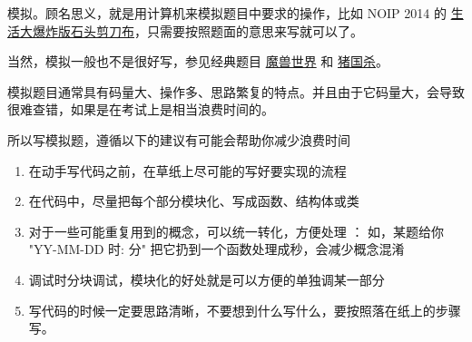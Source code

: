 
模拟。顾名思义，就是用计算机来模拟题目中要求的操作，比如 NOIP 2014 的 \href{https://loj.ac/problem/2498}{生活大爆炸版石头剪刀布}，只需要按照题面的意思来写就可以了。

当然，模拟一般也不是很好写，参见经典题目 \href{http://bailian.openjudge.cn/practice/3750/}{魔兽世界} 和 \href{https://www.lydsy.com/JudgeOnline/problem.php?id=1972}{猪国杀}。

模拟题目通常具有码量大、操作多、思路繁复的特点。并且由于它码量大，会导致很难查错，如果是在考试上是相当浪费时间的。

所以写模拟题，遵循以下的建议有可能会帮助你减少浪费时间

\begin{enumerate}
\item 在动手写代码之前，在草纸上尽可能的写好要实现的流程
\item 在代码中，尽量把每个部分模块化、写成函数、结构体或类
\item 对于一些可能重复用到的概念，可以统一转化，方便处理 ： 如，某题给你 "YY-MM-DD 时: 分" 把它扔到一个函数处理成秒，会减少概念混淆
\item 调试时分块调试，模块化的好处就是可以方便的单独调某一部分
\item 写代码的时候一定要思路清晰，不要想到什么写什么，要按照落在纸上的步骤写。
\end{enumerate}
